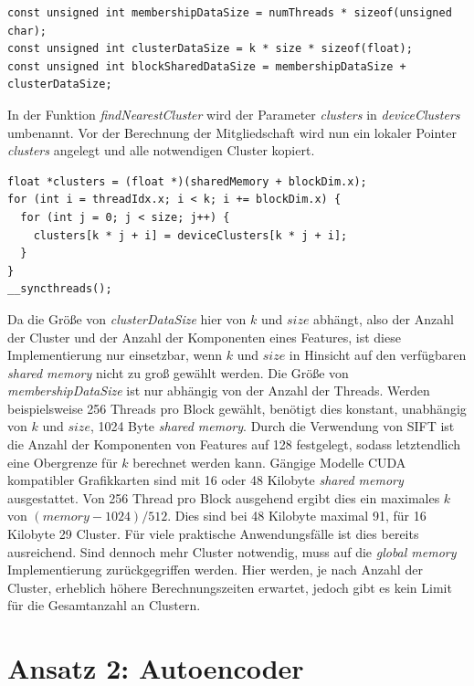 \lstset{language=C}
\begin{lstlisting}
const unsigned int membershipDataSize = numThreads * sizeof(unsigned char);
const unsigned int clusterDataSize = k * size * sizeof(float);
const unsigned int blockSharedDataSize = membershipDataSize + clusterDataSize;
\end{lstlisting}

In der Funktion \textit{findNearestCluster} wird der Parameter \textit{clusters} in \textit{deviceClusters} umbenannt. Vor der Berechnung der Mitgliedschaft wird nun ein lokaler Pointer \textit{clusters} angelegt und alle notwendigen Cluster kopiert.

\lstset{language=C}
\begin{lstlisting}
float *clusters = (float *)(sharedMemory + blockDim.x);
for (int i = threadIdx.x; i < k; i += blockDim.x) {
  for (int j = 0; j < size; j++) {
    clusters[k * j + i] = deviceClusters[k * j + i];
  }
}
__syncthreads();
\end{lstlisting}

Da die Größe von \textit{clusterDataSize} hier von $k$ und $size$ abhängt, also der Anzahl der Cluster und der Anzahl der Komponenten eines Features, ist diese Implementierung nur einsetzbar, wenn $k$ und $size$ in Hinsicht auf den verfügbaren \textit{shared memory} nicht zu groß gewählt werden. Die Größe von \textit{membershipDataSize} ist nur abhängig von der Anzahl der Threads. Werden beispielsweise 256 Threads pro Block gewählt, benötigt dies konstant, unabhängig von $k$ und $size$, 1024 Byte \textit{shared memory}. Durch die Verwendung von SIFT ist die Anzahl der Komponenten von Features auf 128 festgelegt, sodass letztendlich eine Obergrenze für $k$ berechnet werden kann. Gängige Modelle CUDA kompatibler Grafikkarten sind mit 16 oder 48 Kilobyte \textit{shared memory} ausgestattet. Von 256 Thread pro Block ausgehend ergibt dies ein maximales $k$ von $(memory - 1024) / 512$. Dies sind bei 48 Kilobyte maximal 91, für 16 Kilobyte 29 Cluster. Für viele praktische Anwendungsfälle ist dies bereits ausreichend. Sind dennoch mehr Cluster notwendig, muss auf die \textit{global memory} Implementierung zurückgegriffen werden. Hier werden, je nach Anzahl der Cluster, erheblich höhere Berechnungszeiten erwartet, jedoch gibt es kein Limit für die Gesamtanzahl an Clustern.

\section{Ansatz 2: Autoencoder}

